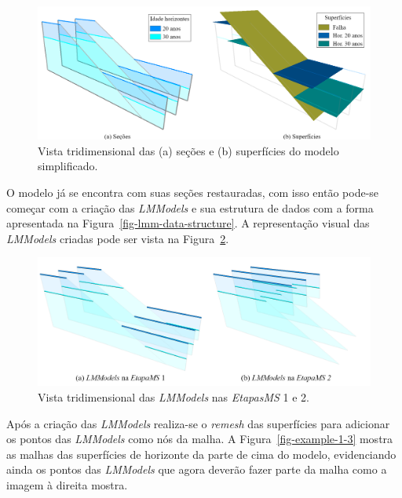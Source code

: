 \begin{figure} [H]
  \begin{center}
    \includegraphics[width=400pt]{images/fig-example-1-1}
    \caption{Vista tridimensional das (a) seções e (b) superfícies do modelo simplificado.}\label{fig-example-1-1}
  \end{center}
\end{figure}

O modelo já se encontra com suas seções restauradas, com isso então pode-se começar com a criação das \textit{LMModels} e sua estrutura de dados com a forma apresentada na Figura~\ref{fig-lmm-data-structure}. A representação visual das \textit{LMModels} criadas pode ser vista na Figura~\ref{fig-example-1-2}.

\begin{figure} [h]
  \begin{center}
    \includegraphics[width=\textwidth]{images/fig-example-1-2}
    \caption{Vista tridimensional das \textit{LMModels} nas \textit{EtapasMS} 1 e 2.}\label{fig-example-1-2}
  \end{center}
\end{figure}

Após a criação das \textit{LMModels} realiza-se o \textit{remesh} das superfícies para adicionar os pontos das \textit{LMModels} como nós da malha. A Figura~\ref{fig-example-1-3} mostra as malhas das superfícies de horizonte da parte de cima do modelo, evidenciando ainda os pontos das \textit{LMModels} que agora deverão fazer parte da malha como a imagem à direita mostra.

